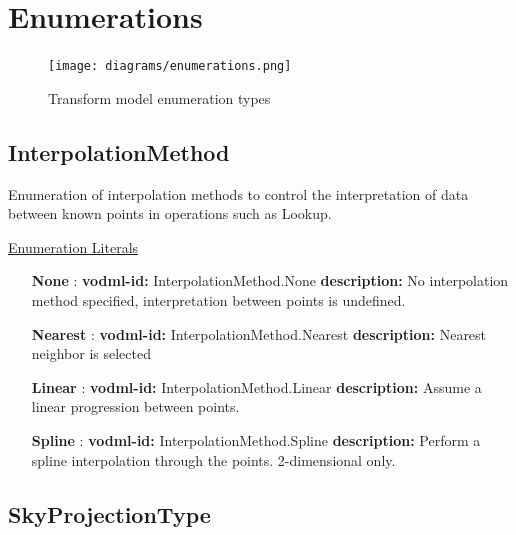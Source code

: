 \pagebreak
\section{Enumerations}

  \begin{figure}[h]
  \begin{center}
    \texttt{[image: diagrams/enumerations.png]}
    \caption{Transform model enumeration types}\label{fig:Enums}
  \end{center}
  \end{figure}

  \subsection{InterpolationMethod}
  \label{sect:InterpolationMethod}

  Enumeration of interpolation methods to control the interpretation of data between known points in operations such as Lookup.

  \noindent \underline{Enumeration Literals}
  \vspace{-\parsep}
  \small
  \begin{itemize}
  
    \item[\textbf{None}]: \textbf{vodml-id:} InterpolationMethod.None \newline
          \textbf{description:} No interpolation method specified, interpretation between points is undefined.
    \item[\textbf{Nearest}]: \textbf{vodml-id:} InterpolationMethod.Nearest \newline
          \textbf{description:} Nearest neighbor is selected
    \item[\textbf{Linear}]: \textbf{vodml-id:} InterpolationMethod.Linear \newline
          \textbf{description:} Assume a linear progression between points.
    \item[\textbf{Spline}]: \textbf{vodml-id:} InterpolationMethod.Spline \newline
          \textbf{description:} Perform a spline interpolation through the points. 2-dimensional only.
  \end{itemize}
  \normalsize

  \subsection{SkyProjectionType}
  \label{sect:SkyProjectionType}

